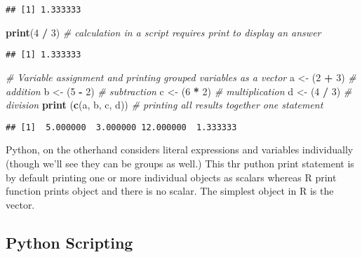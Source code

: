 \documentclass[]{book}
\newenvironment{Shaded}{\begin{snugshade}}{\end{snugshade}}
\newcommand{\KeywordTok}[1]{\textcolor[rgb]{0.13,0.29,0.53}{\textbf{#1}}}
\newcommand{\DecValTok}[1]{\textcolor[rgb]{0.00,0.00,0.81}{#1}}
\newcommand{\StringTok}[1]{\textcolor[rgb]{0.31,0.60,0.02}{#1}}
\newcommand{\CommentTok}[1]{\textcolor[rgb]{0.56,0.35,0.01}{\textit{#1}}}
\newcommand{\OperatorTok}[1]{\textcolor[rgb]{0.81,0.36,0.00}{\textbf{#1}}}
\newcommand{\NormalTok}[1]{#1}
\theoremstyle{definition}
\theoremstyle{definition}
\theoremstyle{definition}
\theoremstyle{remark}
\begin{document}
\begin{verbatim}
## [1] 1.333333
\end{verbatim}

\begin{Shaded}
\begin{Highlighting}[]
\KeywordTok{print}\NormalTok{(}\DecValTok{4} \OperatorTok{/}\StringTok{ }\DecValTok{3}\NormalTok{)    }\CommentTok{# calculation in a script requires print to display an answer}
\end{Highlighting}
\end{Shaded}

\begin{verbatim}
## [1] 1.333333
\end{verbatim}

\begin{Shaded}
\begin{Highlighting}[]
\CommentTok{# Variable assignment and printing grouped variables as a vector}
\NormalTok{a <-}\StringTok{ }\NormalTok{(}\DecValTok{2} \OperatorTok{+}\StringTok{ }\DecValTok{3}\NormalTok{)           }\CommentTok{# addition}
\NormalTok{b <-}\StringTok{ }\NormalTok{(}\DecValTok{5} \OperatorTok{-}\StringTok{ }\DecValTok{2}\NormalTok{)           }\CommentTok{# subtraction}
\NormalTok{c <-}\StringTok{ }\NormalTok{(}\DecValTok{6} \OperatorTok{*}\StringTok{ }\DecValTok{2}\NormalTok{)           }\CommentTok{# multiplication}
\NormalTok{d <-}\StringTok{ }\NormalTok{(}\DecValTok{4} \OperatorTok{/}\StringTok{ }\DecValTok{3}\NormalTok{)           }\CommentTok{# division}
\KeywordTok{print}\NormalTok{ (}\KeywordTok{c}\NormalTok{(a, b, c, d))  }\CommentTok{# printing all results together one statement}
\end{Highlighting}
\end{Shaded}

\begin{verbatim}
## [1]  5.000000  3.000000 12.000000  1.333333
\end{verbatim}

Python, on the otherhand considers literal expressions and variables
individually (though we'll see they can be groups as well.) This thr
puthon print statement is by default printing one or more individual
objects as scalars whereas R print function prints object and there is
no scalar. The simplest object in R is the vector.

\subsection{Python Scripting}\label{python-scripting}
\end{document}
